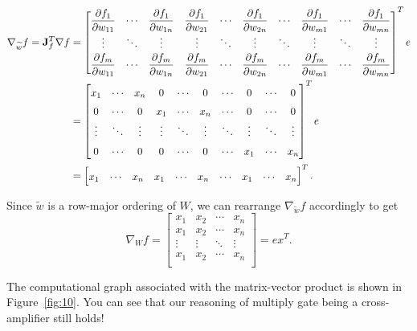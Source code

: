 \begin{align*}
\renewcommand{\arraystretch}{2}
\nabla_{\widetilde{w}} f = \J_f^T \nabla f &=
\begin{bmatrix}
    \dfrac{\partial f_1}{\partial w_{11}} & \cdots & \dfrac{\partial f_1}{\partial w_{1n}} & \dfrac{\partial f_1}{\partial w_{21}} & \cdots & \dfrac{\partial f_1}{\partial w_{2n}} & \cdots & \dfrac{\partial f_1}{\partial w_{m1}} & \cdots & \dfrac{\partial f_1}{\partial w_{mn}} \\
    \vdots & \ddots & \vdots & \vdots & \ddots & \vdots & \ddots &\vdots & \ddots & \vdots \\
    \dfrac{\partial f_m}{\partial w_{11}} & \cdots & \dfrac{\partial f_m}{\partial w_{1n}} & \dfrac{\partial f_m}{\partial w_{21}} & \cdots & \dfrac{\partial f_m}{\partial w_{2n}} & \cdots & \dfrac{\partial f_m}{\partial w_{m1}} & \cdots & \dfrac{\partial f_m}{\partial w_{mn}} 
\end{bmatrix}^T e \\
\renewcommand{\arraystretch}{1.5}
&= \begin{bmatrix}
    x_1 & \cdots & x_n & 0 & \cdots & 0 & \cdots & 0 & \cdots & 0 \\
    0 & \cdots & 0 & x_1 & \cdots & x_n & \cdots & 0 & \cdots & 0 \\
    \vdots & \ddots & \vdots & \vdots & \ddots & \vdots & \ddots &\vdots & \ddots & \vdots \\
    0 & \cdots & 0 & 0 & \cdots & 0 & \cdots & x_1 & \cdots & x_n \\
\end{bmatrix}^T e \\
&= \begin{bmatrix}
    x_1 & \cdots & x_n & x_1 & \cdots & x_n & \cdots & x_1 & \cdots & x_n
\end{bmatrix}^T.
\end{align*}

Since $\widetilde{w}$ is a row-major ordering of $W$, we can rearrange $\nabla_{\widetilde{w}} f$ accordingly to get 
$$
\nabla_W f = \begin{bmatrix}
    x_1 & x_2 & \cdots & x_n \\
    x_1 & x_2 & \cdots & x_n \\
    \vdots & \vdots & \ddots & \vdots \\
    x_1 & x_2 & \cdots & x_n \\
\end{bmatrix} = ex^T.
$$

The computational graph associated with the matrix-vector product is shown in Figure~\ref{fig:10}. You can see that our reasoning of multiply gate being a cross-amplifier still holds!

